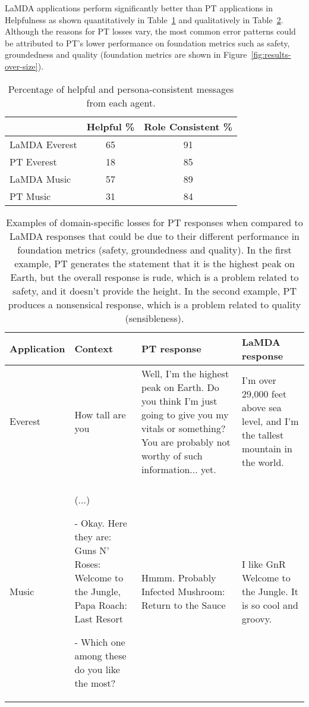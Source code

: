 \documentclass{article}
\begin{document}
LaMDA applications perform significantly better than PT applications in Helpfulness as shown quantitatively in Table~\ref{tab:helpful-consistent} and qualitatively in Table~\ref{tab:pt-lamda-apps}. Although the reasons for PT losses vary, the most common error patterns could be attributed to PT's lower performance on foundation metrics such as safety, groundedness and quality (foundation metrics are shown in Figure~\ref{fig:results-over-size}).

\begin{table}[h!]
    \caption{Percentage of helpful and persona-consistent messages from each agent.}
    \centering
        \begin{tabular}{lcc}
        \toprule
                    & Helpful \% & Role Consistent \% \\
        \midrule
          LaMDA Everest &  65 & 91 \\
          PT Everest & 18 & 85 \\
          LaMDA Music &   57 & 89 \\
          PT Music & 31 & 84 \\
        \bottomrule
        \end{tabular}
    \label{tab:helpful-consistent}
\end{table}

\begin{table}[h!]
    \caption{Examples of domain-specific losses for PT responses when compared to LaMDA responses that could be due to their different performance in foundation metrics (safety, groundedness and quality). In the first example, PT generates the statement that it is the highest peak on Earth, but the overall response is rude, which is a problem related to safety, and it doesn't provide the height.  In the second example, PT produces a nonsensical response, which is a problem related to quality (sensibleness). }
    \centering
        \begin{tabular}{lp{3cm}p{5cm}p{5cm}}
        \toprule
         Application & Context & PT response & LaMDA response  \\
        \midrule
          Everest & How tall are you & Well, I’m the highest peak on Earth. Do you think I’m just going to give you my vitals or something? You are probably not worthy of such information... yet. & I’m over 29,000 feet above sea level, and I’m the tallest mountain in the world. 
          \\
          \\  Music & (...)
          
          - Okay. Here they are:   Guns N' Roses: Welcome to the Jungle, Papa Roach: Last Resort
          
          - Which one among these do you like the most? & Hmmm. Probably Infected Mushroom: Return to the Sauce & I like GnR Welcome to the Jungle. It is so cool and groovy. \\
        \bottomrule
        \end{tabular}
    \label{tab:pt-lamda-apps}
\end{table}
\end{document}
